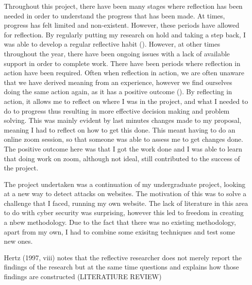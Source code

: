 

Throughout this project, there have been many stages where reflection has been needed in order to understand the progress that has been made. At times, progress has felt limited and non-existent. However, these periods have allowed for reflection. By regularly putting my research on hold and taking a step back, I was able to develop a regular reflective habit  (\cite{dyment2010quality}). However, at other times throughout the year, there have been ongoing issues with a lack of available support in order to complete work. There have been periods where reflection in action have been required. Often when reflection in action, we are often unaware that we have derived meaning from an experience, however we find ourselves doing the same action again, as it has a positive outcome (\cite{Schon83}). By reflecting in action, it allows me to reflect on where I was in the project, and what I needed to do to progress thus resulting in more effective decision making and problem solving. This was mainly evident by last minutes changes made to my proposal, meaning I had to reflect on how to get this done. This meant having to do an online zoom session, so that someone was able to assess me to get changes done. The positive outcome here was that I got the work done and I was able to learn that doing work on zoom, although not ideal, still contributed to the success of the project.


The project undertaken was a continuation of my undergraduate project, looking at a new way to detect attacks on websites. The motivation of this was to solve a challenge that I faced, running my own website. The lack of literature in this area to do with cyber security was surprising, however this led to freedom in creating a nbew methodology. Due to the fact that there was no existing methodology, apart from my own, I had to combine some exisitng techniques and test some new ones.

Hertz (1997, viii) notes that the reflective researcher does not merely report the findings of the research but at the same time questions and explains how those findings are constructed (LITERATIURE REVIEW)
